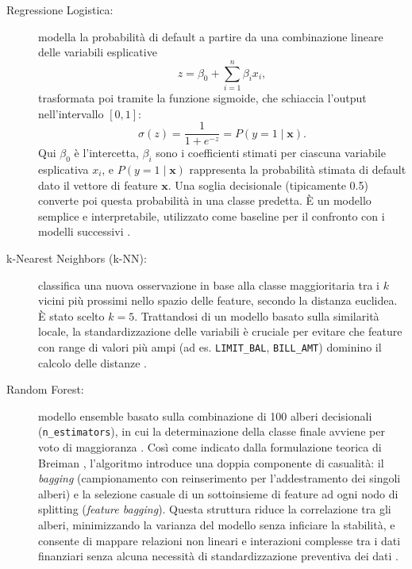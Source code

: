 \documentclass[11pt,a4paper]{article}
\begin{document}
\begin{description}
    \item[Regressione Logistica:] modella la probabilità di default a partire da una combinazione lineare delle variabili esplicative
    \begin{equation}
        z = \beta_0 + \sum_{i=1}^{n} \beta_i x_i,
        \label{eq:linear-combination}
    \end{equation}
    trasformata poi tramite la funzione sigmoide, che schiaccia l'output nell'intervallo $[0,1]$:
    \begin{equation}
        \sigma(z) = \frac{1}{1 + e^{-z}} = P(y=1 \mid \mathbf{x}).
        \label{eq:sigmoid}
    \end{equation}
    Qui $\beta_0$ è l'intercetta, $\beta_i$ sono i coefficienti stimati per ciascuna variabile esplicativa $x_i$, e $P(y=1 \mid \mathbf{x})$ rappresenta la probabilità stimata di default dato il vettore di feature $\mathbf{x}$. Una soglia decisionale (tipicamente 0.5) converte poi questa probabilità in una classe predetta. È un modello semplice e interpretabile, utilizzato come baseline per il confronto con i modelli successivi \cite{poggi2025}.
    \item[k-Nearest Neighbors (k-NN):] classifica una nuova osservazione in base alla classe maggioritaria tra i $k$ vicini più prossimi nello spazio delle feature, secondo la distanza euclidea. È stato scelto $k = 5$. Trattandosi di un modello basato sulla similarità locale, la standardizzazione delle variabili è cruciale per evitare che feature con range di valori più ampi (ad es. \texttt{LIMIT\_BAL}, \texttt{BILL\_AMT}) dominino il calcolo delle distanze \cite{poggi2025}.
    \item[Random Forest:] modello ensemble basato sulla combinazione di 100 alberi decisionali (\texttt{n\_estimators}), in cui la determinazione della classe finale avviene per voto di maggioranza \cite{breiman2001}. Così come indicato dalla formulazione teorica di Breiman \cite{breiman2001}, l'algoritmo introduce una doppia componente di casualità: il \emph{bagging} (campionamento con reinserimento per l'addestramento dei singoli alberi) e la selezione casuale di un sottoinsieme di feature ad ogni nodo di splitting (\emph{feature bagging}). Questa struttura riduce la correlazione tra gli alberi, minimizzando la varianza del modello senza inficiare la stabilità, e consente di mappare relazioni non lineari e interazioni complesse tra i dati finanziari senza alcuna necessità di standardizzazione preventiva dei dati \cite{poggi2025}.
\end{description}
\end{document}
